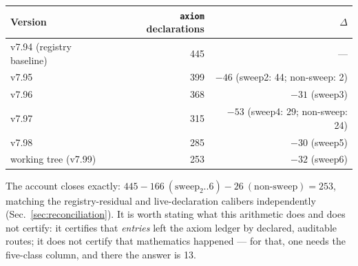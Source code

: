 \begin{center}
\small
\begin{tabular}{@{}lrr@{}}
\toprule
Version & \texttt{axiom} declarations & $\Delta$ \\
\midrule
v7.94 (registry baseline) & 445 & --- \\
v7.95 & 399 & $-46$ (sweep2: 44; non-sweep: 2) \\
v7.96 & 368 & $-31$ (sweep3) \\
v7.97 & 315 & $-53$ (sweep4: 29; non-sweep: 24) \\
v7.98 & 285 & $-30$ (sweep5) \\
working tree (v7.99) & 253 & $-32$ (sweep6) \\
\bottomrule
\end{tabular}
\end{center}

The account closes exactly: $445 - 166\ (\text{sweep}_2..6) - 26\
(\text{non-sweep}) = 253$, matching the registry-residual and
live-declaration calibers independently
(Sec.~\ref{sec:reconciliation}). It is worth stating what this
arithmetic does and does not certify: it certifies that
\emph{entries} left the axiom ledger by declared, auditable routes;
it does not certify that mathematics happened --- for that, one
needs the five-class column, and there the answer is 13.
